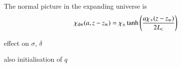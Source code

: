 



\newcommand{\brchi}{\breve{\chi}}
\newcommand{\brq}{\breve{q}}
\newcommand{\sppt}{\ALIASsppt}
\newcommand{\eqregimenum}[1]{{\footnotesize{\textsf{\textbf{({#1})}}}}}










The normal picture in the expanding universe is
\begin{equation}
    \chi_\mathrm{dw}(a, z-z_\mathrm{w}) = \chi_\pm \tanh{ {\left( \frac{a\chi_+(z-z\ensuremath{_\mathrm{w}})}{2L_{\text{\tiny{C}}}}  \right)}}
\end{equation}




\begin{bullets}
    \item effect on $\sigma$, $\delta$
    \item also initialisation of $q$
\end{bullets}



